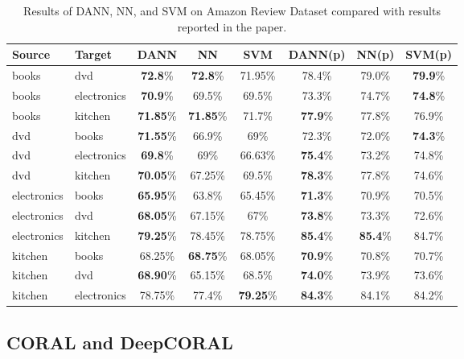 \documentclass{article}
\begin{document}
\begin{table}[t]
  \centering
  \caption{Results of DANN, NN, and SVM on Amazon Review Dataset compared with results reported in the paper.}
  \label{tab:DANN_Sentiment}
  \begin{tabular}{llcccccc}
    \toprule
    Source & Target & DANN & NN & SVM & DANN(p) & NN(p) & SVM(p) \\
    \midrule
    books & dvd         & \textbf{72.8}\% & \textbf{72.8}\% & 71.95\% & 78.4\% & 79.0\% & \textbf{79.9}\% \\
    books & electronics & \textbf{70.9}\% & 69.5\% & 69.5\% & 73.3\% & 74.7\% & \textbf{74.8}\% \\
    books & kitchen     & \textbf{71.85}\% & \textbf{71.85}\% & 71.7\% & \textbf{77.9}\% & 77.8\% & 76.9\% \\
    dvd   & books       & \textbf{71.55}\% & 66.9\% & 69\% & 72.3\% & 72.0\% & \textbf{74.3}\% \\
    dvd   & electronics & \textbf{69.8}\% & 69\% & 66.63\% & \textbf{75.4}\% & 73.2\% & 74.8\% \\
    dvd   & kitchen     & \textbf{70.05}\% & 67.25\% & 69.5\% & \textbf{78.3}\% & 77.8\% & 74.6\% \\
    electronics & books       & \textbf{65.95}\% & 63.8\% & 65.45\% & \textbf{71.3}\% & 70.9\% & 70.5\% \\
    electronics & dvd         & \textbf{68.05}\% & 67.15\% & 67\% & \textbf{73.8}\% & 73.3\% & 72.6\% \\
    electronics & kitchen     & \textbf{79.25}\% & 78.45\% & 78.75\% & \textbf{85.4}\% & \textbf{85.4}\% & 84.7\% \\
    kitchen & books       & 68.25\% & \textbf{68.75}\% & 68.05\% & \textbf{70.9}\% & 70.8\% & 70.7\% \\
    kitchen & dvd         & \textbf{68.90}\% & 65.15\% & 68.5\% & \textbf{74.0}\% & 73.9\% & 73.6\% \\
    kitchen & electronics & 78.75\% & 77.4\% & \textbf{79.25}\% & \textbf{84.3}\% & 84.1\% & 84.2\% \\
    \bottomrule
  \end{tabular}
\end{table}

\subsection{CORAL and DeepCORAL}
\end{document}
